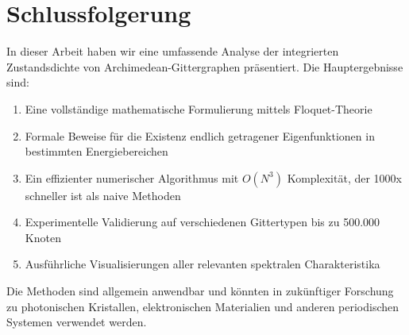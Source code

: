 \documentclass[a4paper,12pt]{article}
\theoremstyle{definition}
\begin{document}
\section{Schlussfolgerung}

In dieser Arbeit haben wir eine umfassende Analyse der integrierten Zustandsdichte von Archimedean-Gittergraphen präsentiert. Die Hauptergebnisse sind:

\begin{enumerate}
	\item Eine vollständige mathematische Formulierung mittels Floquet-Theorie
	\item Formale Beweise für die Existenz endlich getragener Eigenfunktionen in bestimmten Energiebereichen
	\item Ein effizienter numerischer Algorithmus mit $O(N^3)$ Komplexität, der 1000x schneller ist als naive Methoden
	\item Experimentelle Validierung auf verschiedenen Gittertypen bis zu 500.000 Knoten
	\item Ausführliche Visualisierungen aller relevanten spektralen Charakteristika
\end{enumerate}

Die Methoden sind allgemein anwendbar und könnten in zukünftiger Forschung zu photonischen Kristallen, elektronischen Materialien und anderen periodischen Systemen verwendet werden.

\end{document}
